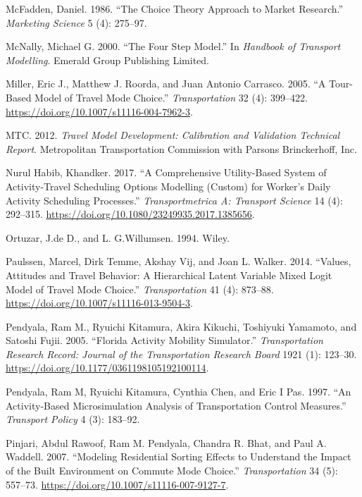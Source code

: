 \documentclass[12pt, oneside, openright]{byuthesis}
\newlength{\cslhangindent}
\newlength{\cslentryspacingunit} %
\newenvironment{CSLReferences}[2] %
 {%
  \setlength{\parindent}{0pt}
  \ifodd #1
  \let\oldpar\par
  \def\par{\hangindent=\cslhangindent\oldpar}
  \fi
  \setlength{\parskip}{#2\cslentryspacingunit}
 }%
 {}
\begin{document}
\begin{CSLReferences}{1}{0}
\leavevmode{}%
McFadden, Daniel. 1986. {``The Choice Theory Approach to Market Research.''} \emph{Marketing Science} 5 (4): 275--97.

\leavevmode{}%
McNally, Michael G. 2000. {``The Four Step Model.''} In \emph{Handbook of Transport Modelling}. Emerald Group Publishing Limited.

\leavevmode{}%
Miller, Eric J., Matthew J. Roorda, and Juan Antonio Carrasco. 2005. {``A Tour-Based Model of Travel Mode Choice.''} \emph{Transportation} 32 (4): 399--422. \url{https://doi.org/10.1007/s11116-004-7962-3}.

\leavevmode{}%
MTC. 2012. \emph{Travel Model Development: Calibration and Validation Technical Report}. Metropolitan Transportation Commission with Parsons Brinckerhoff, Inc.

\leavevmode{}%
Nurul Habib, Khandker. 2017. {``A Comprehensive Utility-Based System of Activity-Travel Scheduling Options Modelling (Custom) for Worker's Daily Activity Scheduling Processes.''} \emph{Transportmetrica A: Transport Science} 14 (4): 292--315. \url{https://doi.org/10.1080/23249935.2017.1385656}.

\leavevmode{}%
Ortuzar, J.de D., and L. G.Willumsen. 1994. Wiley.

\leavevmode{}%
Paulssen, Marcel, Dirk Temme, Akshay Vij, and Joan L. Walker. 2014. {``Values, Attitudes and Travel Behavior: A Hierarchical Latent Variable Mixed Logit Model of Travel Mode Choice.''} \emph{Transportation} 41 (4): 873--88. \url{https://doi.org/10.1007/s11116-013-9504-3}.

\leavevmode{}%
Pendyala, Ram M., Ryuichi Kitamura, Akira Kikuchi, Toshiyuki Yamamoto, and Satoshi Fujii. 2005. {``Florida Activity Mobility Simulator.''} \emph{Transportation Research Record: Journal of the Transportation Research Board} 1921 (1): 123--30. \url{https://doi.org/10.1177/0361198105192100114}.

\leavevmode{}%
Pendyala, Ram M, Ryuichi Kitamura, Cynthia Chen, and Eric I Pas. 1997. {``An Activity-Based Microsimulation Analysis of Transportation Control Measures.''} \emph{Transport Policy} 4 (3): 183--92.

\leavevmode{}%
Pinjari, Abdul Rawoof, Ram M. Pendyala, Chandra R. Bhat, and Paul A. Waddell. 2007. {``Modeling Residential Sorting Effects to Understand the Impact of the Built Environment on Commute Mode Choice.''} \emph{Transportation} 34 (5): 557--73. \url{https://doi.org/10.1007/s11116-007-9127-7}.


\end{CSLReferences}
\end{document}
